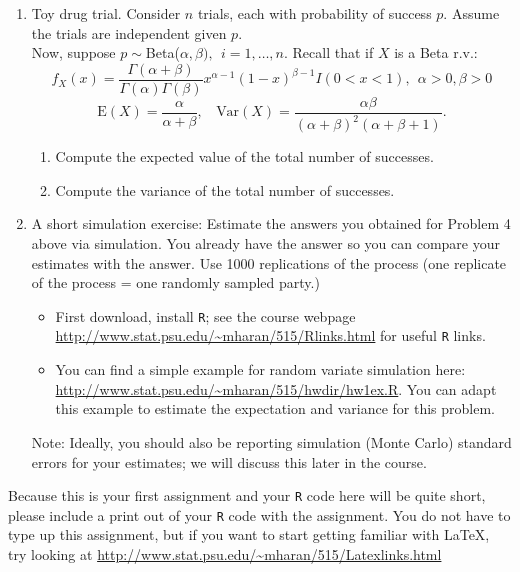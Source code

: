 \documentclass{article}
\begin{document}
\begin{enumerate}
\item Toy drug trial. Consider $n$ trials, each with probability of success
$p$. Assume the trials are independent given $p$. \\Now, suppose $p
\sim $Beta($\alpha,\beta),\:\:i=1,\dots,n$. 
Recall that if $X$ is a Beta r.v.:
$$ f_X(x)=\frac{\Gamma(\alpha+\beta)}{\Gamma(\alpha)\Gamma(\beta)} x^{\alpha -1} (1-x)^{\beta-1} I(0<x<1),\:\: \alpha>0,\beta>0$$
$$ \text{E}(X)=\frac{\alpha}{\alpha + \beta},\:\:\:\: \text{Var}(X)=\frac{\alpha \beta}{(\alpha + \beta)^2 (\alpha + \beta+1)}.$$
\begin{enumerate}
\item Compute the expected value of the total number of successes.
\item Compute the variance of the total number of successes.
\end{enumerate}

\item  \noindent A short simulation exercise:
  \noindent Estimate the answers you obtained for Problem 4 above via
  simulation. You already have the answer so you can compare your
  estimates with the answer. Use 1000 replications of the
  process (one replicate of the process = one randomly sampled party.)
\begin{itemize}
\item First download, install {\tt R}; see the course webpage \url{http://www.stat.psu.edu/~mharan/515/Rlinks.html} for useful {\tt R} links.
\item You can find a simple example for random variate simulation
  here: \url{http://www.stat.psu.edu/~mharan/515/hwdir/hw1ex.R}. You
  can adapt this example to estimate the expectation and variance for this problem. 
\end{itemize}
Note: Ideally, you should also be reporting simulation (Monte Carlo) standard errors for your estimates; we will discuss this later in the course.
\end{enumerate}

Because this is your first assignment and your {\tt R} code here will
be quite short, please include a print out of your {\tt R} code with
the assignment.  You do not have to type up this assignment, but if
you want to start getting familiar with LaTeX, try looking at
\url{http://www.stat.psu.edu/~mharan/515/Latexlinks.html}
\end{document}
